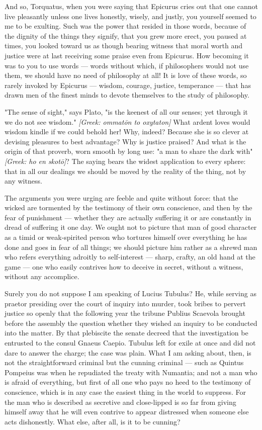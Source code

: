  And so, Torquatus, when you were saying that Epicurus cries out that one cannot live pleasantly unless one lives honestly, wisely, and justly, you yourself seemed to me to be exulting. Such was the power that resided in those words, because of the dignity of the things they signify, that you grew more erect, you paused at times, you looked toward us as though bearing witness that moral worth and justice were at last receiving some praise even from Epicurus. How becoming it was to you to use words — words without which, if philosophers would not use them, we should have no need of philosophy at all! It is love of these words, so rarely invoked by Epicurus — wisdom, courage, justice, temperance — that has drawn men of the finest minds to devote themselves to the study of philosophy.

 "The sense of sight," says Plato, "is the keenest of all our senses; yet through it we do not see wisdom." \textit{[Greek: ommatōn to oxytaton]} What ardent loves would wisdom kindle if we could behold her! Why, indeed? Because she is so clever at devising pleasures to best advantage? Why is justice praised? And what is the origin of that proverb, worn smooth by long use: "a man to share the dark with" \textit{[Greek: ho en skotō]}? The saying bears the widest application to every sphere: that in all our dealings we should be moved by the reality of the thing, not by any witness.

 The arguments you were urging are feeble and quite without force: that the wicked are tormented by the testimony of their own conscience, and then by the fear of punishment — whether they are actually suffering it or are constantly in dread of suffering it one day. We ought not to picture that man of good character as a timid or weak-spirited person who tortures himself over everything he has done and goes in fear of all things; we should picture him rather as a shrewd man who refers everything adroitly to self-interest — sharp, crafty, an old hand at the game — one who easily contrives how to deceive in secret, without a witness, without any accomplice.

 Surely you do not suppose I am speaking of Lucius Tubulus? He, while serving as praetor presiding over the court of inquiry into murder, took bribes to pervert justice so openly that the following year the tribune Publius Scaevola brought before the assembly the question whether they wished an inquiry to be conducted into the matter. By that plebiscite the senate decreed that the investigation be entrusted to the consul Gnaeus Caepio. Tubulus left for exile at once and did not dare to answer the charge; the case was plain. What I am asking about, then, is not the straightforward criminal but the cunning criminal — such as Quintus Pompeius was when he repudiated the treaty with Numantia; and not a man who is afraid of everything, but first of all one who pays no heed to the testimony of conscience, which is in any case the easiest thing in the world to suppress. For the man who is described as secretive and close-lipped is so far from giving himself away that he will even contrive to appear distressed when someone else acts dishonestly. What else, after all, is it to be cunning?

